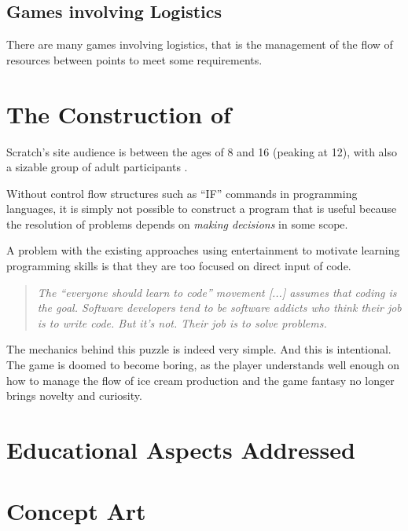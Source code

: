 \documentclass{sigchi}
\begin{document}
	\subsection{Games involving Logistics}
		There are many games involving logistics, that is the management of the flow of resources between points to meet some requirements. 

\section{The Construction of \gamename}

	Scratch's site audience is between the ages of 8 and 16 (peaking at 12), with also a sizable group of adult participants \cite{Resnick2009}.
	
	Without control flow structures such as ``IF'' commands in programming languages, it is simply not possible to construct a program that is useful because the resolution of problems depends on \textit{making decisions} in some scope.
	
	A problem with the existing approaches using entertainment to motivate learning programming skills is that they are too focused on direct input of code.
	\begin{quotation}
		\noindent
		\textit{The ``everyone should learn to code'' movement [...] assumes that coding is the goal. Software developers tend to be software addicts who think their job is to write code. But it's not. Their job is to solve problems.} \cite{Atwood2012}
	\end{quotation}
	
	The mechanics behind this puzzle is indeed very simple. And this is intentional. The game is doomed to become boring, as the player understands well enough on how to manage the flow of ice cream production and the game fantasy no longer brings novelty and curiosity.
	
\section{Educational Aspects Addressed}

\section{Concept Art}
\end{document}
